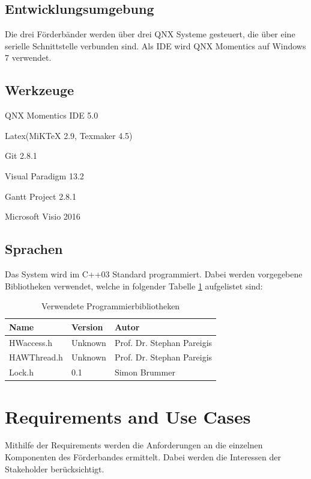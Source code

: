 \documentclass[a4paper, 11pt]{article}
\begin{document}
\subsection{Entwicklungsumgebung}
Die drei Förderbänder werden über drei QNX Systeme gesteuert, die über eine serielle Schnittstelle verbunden sind. Als IDE wird QNX Momentics auf Windows 7 verwendet.

\subsection{Werkzeuge}
\begin{compactenum}[-]
    \item QNX Momentics IDE 5.0
    \item Latex(MiKTeX 2.9, Texmaker 4.5)
    \item Git 2.8.1
    \item Visual Paradigm 13.2
    \item Gantt Project 2.8.1
    \item Microsoft Visio 2016
\end{compactenum}

\subsection{Sprachen}
Das System wird im C++03 Standard programmiert. Dabei werden vorgegebene Bibliotheken verwendet, welche in folgender Tabelle \ref{bibl} aufgelistet sind:
\medskip
\begin{table}[h]
\centering
    \begin{tabular}{|l|l|l|}
    \hline
    \textbf{Name}&\textbf{Version}&\textbf{Autor}\\
    \hline
    HWaccess.h&Unknown&Prof. Dr. Stephan Pareigis\\
    \hline
    HAWThread.h&Unknown&Prof. Dr. Stephan Pareigis \\
    \hline
    Lock.h&0.1&Simon Brummer \\
    \hline
    \end{tabular}
    \caption{Verwendete Programmierbibliotheken}
    \label{bibl}
\end{table}

\newpage

\section{Requirements and Use Cases}
Mithilfe der Requirements werden die Anforderungen an die einzelnen Komponenten des Förderbandes ermittelt. Dabei werden die Interessen der Stakeholder berücksichtigt.
\end{document}
